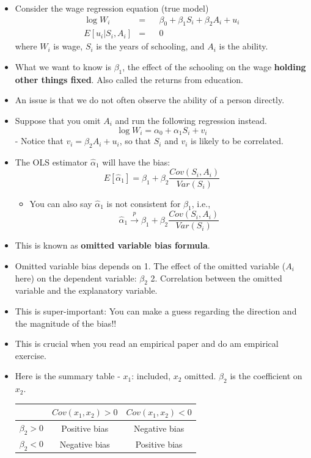 \documentclass[]{book}
\providecommand{\tightlist}{%
  \setlength{\itemsep}{0pt}\setlength{\parskip}{0pt}}
\begin{document}
\begin{itemize}
\item
  Consider the wage regression equation (true model) \[
  \begin{aligned}
  \log W_{i}  &=&  & \beta_{0}+\beta_{1}S_{i}+\beta_{2}A_{i}+u_{i} \\
  E[u_{i}|S_{i},A_{i}]    &=& & 0
  \end{aligned}
  \] where \(W_{i}\) is wage, \(S_{i}\) is the years of schooling, and
  \(A_{i}\) is the ability.
\item
  What we want to know is \(\beta_1\), the effect of the schooling on
  the wage \textbf{holding other things fixed}. Also called the returns
  from education.
\item
  An issue is that we do not often observe the ability of a person
  directly.
\item
  Suppose that you omit \(A_i\) and run the following regression
  instead. \[
  \log W_{i}  =   \alpha_{0}+\alpha_{1} S_{i} + v_i 
  \] - Notice that \(v_i = \beta_2 A_i + u_i\), so that \(S_i\) and
  \(v_i\) is likely to be correlated.
\item
  The OLS estimator \(\hat\alpha_1\) will have the bias: \[ 
  E[\hat\alpha_1] = \beta_1 + \beta_2\frac{Cov(S_i, A_i)}{Var(S_i)} \]

  \begin{itemize}
  \tightlist
  \item
    You can also say \(\hat\alpha_1\) is not consistent for \(\beta_1\),
    i.e., \[
    \hat{\alpha}_{1}\overset{p}{\longrightarrow}\beta_{1}+\beta_{2}\frac{Cov(S_{i},A_{i})}{Var(S_{i})}
    \]
  \end{itemize}
\item
  This is known as \textbf{omitted variable bias formula}.
\item
  Omitted variable bias depends on 1. The effect of the omitted variable
  (\(A_i\) here) on the dependent variable: \(\beta_2\) 2. Correlation
  between the omitted variable and the explanatory variable.
\item
  This is super-important: You can make a guess regarding the direction
  and the magnitude of the bias!!
\item
  This is crucial when you read an empirical paper and do am empirical
  exercise.
\item
  Here is the summary table - \(x_1\): included, \(x_2\) omitted.
  \(\beta_2\) is the coefficient on \(x_2\).

  \begin{longtable}[]{@{}ccc@{}}
  \toprule
  & \(Cov(x_1, x_2) > 0\) & \(Cov(x_1, x_2) < 0\)\tabularnewline
  \midrule
  \endhead
  \(\beta_2 > 0\) & Positive bias & Negative bias\tabularnewline
  \(\beta_2 < 0\) & Negative bias & Positive bias\tabularnewline
  \bottomrule
  \end{longtable}
\end{itemize}
\end{document}
